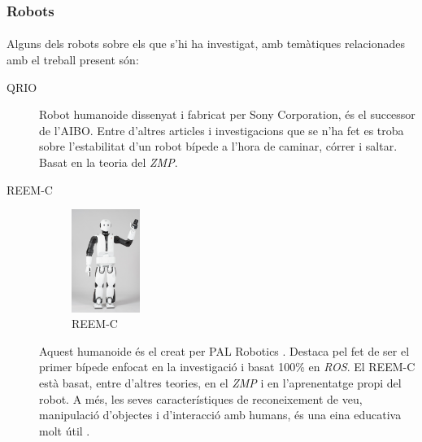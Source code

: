 \documentclass[12pt,a4paper,final,twoside]{article}
\begin{document}
\subsubsection{Robots}
\label{Robots}

\paragraph{}Alguns dels robots sobre els que s'hi ha investigat, amb temàtiques relacionades amb el treball present són:
\begin{description}
\item[QRIO]
\begin{minipage}[t]{0.94\linewidth}
Robot humanoide dissenyat i fabricat per Sony Corporation, és el successor de l'AIBO. Entre d'altres articles i investigacions que se n'ha fet es troba \cite{Nagasaka2004} sobre l'estabilitat d'un robot bípede a l'hora de caminar, córrer i saltar. Basat en la teoria del \textit{ZMP}.
\end{minipage}

\item[REEM-C]
\begin{minipage}[t]{0.94\linewidth}
	\begin{figure}
	    \centering
		\includegraphics[width=0.22\textwidth]{Imatges/REEM-C}
                \caption{REEM-C \cite{REEM_C}}
     \end{figure}
Aquest humanoide és el creat per PAL Robotics \cite{REEM_C}. Destaca pel fet de ser el primer bípede enfocat en la investigació i basat 100\% en \textit{ROS}. El REEM-C està basat, entre d'altres teories, en el \textit{ZMP} i en l'aprenentatge propi del robot. A més, les seves característiques de reconeixement de veu, manipulació d'objectes i d'interacció amb humans, és una eina educativa molt útil \cite{REEM_C}.
\end{minipage}

\paragraph{}$ $%


\end{description}
\end{document}
